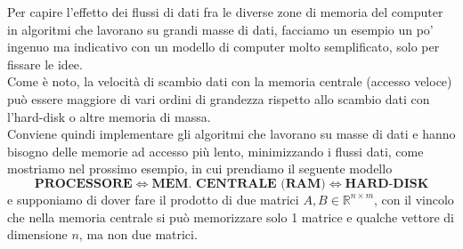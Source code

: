 Per capire l'effetto dei flussi di dati fra le diverse zone di memoria del computer in algoritmi che lavorano su grandi masse di dati, facciamo un esempio un po' ingenuo ma indicativo con un modello di computer molto semplificato, solo per fissare le idee.\\
Come è noto, la velocità di scambio dati con la memoria centrale (accesso veloce) può essere maggiore di vari ordini di grandezza rispetto allo scambio dati con l'hard-disk o altre memoria di massa. \\ 
Conviene quindi implementare gli algoritmi che lavorano su masse di dati e hanno bisogno delle memorie ad accesso più lento, minimizzando i flussi dati, come mostriamo nel prossimo esempio, in cui prendiamo il seguente modello
\[ \textbf{PROCESSORE} \iff \textbf{MEM. CENTRALE (RAM)} \iff \textbf{HARD-DISK} \]
e supponiamo di dover fare il prodotto di due matrici $A,B\in \mathbb{R}^{n\times m}$, con il vincolo che nella memoria centrale si può memorizzare solo 1 matrice e qualche vettore di dimensione $n$, ma non due matrici.

